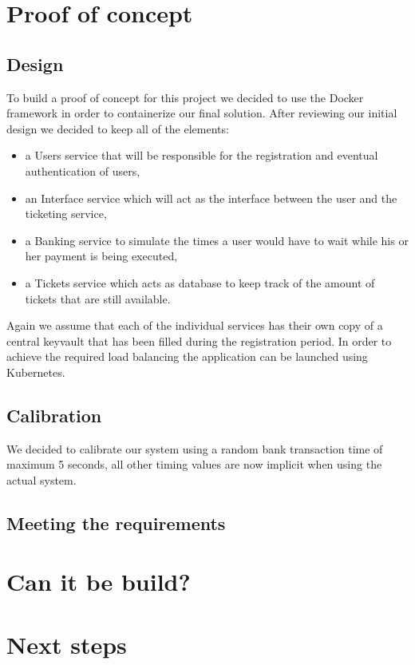 \documentclass[10pt,a4paper,twocolumn]{article}
\begin{document}
\section{Proof of concept}
\subsection{Design}
To build a proof of concept for this project we decided to use the Docker framework in order to containerize our final solution. After reviewing our initial design we decided to keep all of the elements:
\begin{itemize}
	\item a Users service that will be responsible for the registration and eventual authentication of users,
	\item an Interface service which will act as the interface between the user and the ticketing service,
	\item a Banking service to simulate the times a user would have to wait while his or her payment is being executed,
	\item a Tickets service which acts as database to keep track of the amount of tickets that are still available.
\end{itemize}
Again we assume that each of the individual services has their own copy of a central keyvault that has been filled during the registration period. In order to achieve the required load balancing the application can be launched using Kubernetes.\\

\subsection{Calibration}
We decided to calibrate our system using a random bank transaction time of maximum 5 seconds, all other timing values are now implicit when using the actual system.

\subsection{Meeting the requirements}

\section{Can it be build?}

\section{Next steps}
\end{document}
